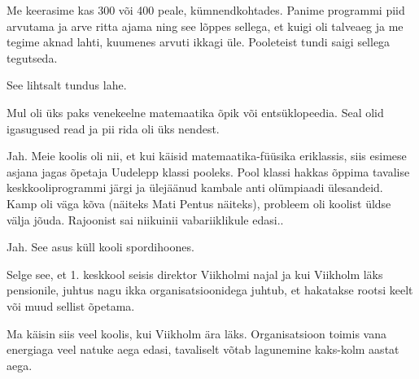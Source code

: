 Me keerasime kas 300 või 400 peale, kümnendkohtades. Panime programmi piid arvutama ja arve ritta ajama ning see lõppes sellega, et 
kuigi oli talveaeg ja me tegime aknad lahti, kuumenes arvuti ikkagi üle. 
Pooleteist tundi saigi sellega tegutseda.


See lihtsalt tundus lahe.


Mul oli üks paks venekeelne matemaatika õpik või 
entsüklopeedia. Seal olid igasugused read ja pii rida oli 
üks nendest.


Jah. Meie koolis oli nii, et kui käisid 
matemaatika-füüsika eriklassis, siis esimese asjana jagas õpetaja 
Uudelepp klassi pooleks. Pool klassi hakkas õppima tavalise 
keskkooliprogrammi järgi ja ülejäänud kambale anti olümpiaadi ülesandeid. 
Kamp oli väga kõva (näiteks Mati 
Pentus näiteks), probleem oli koolist üldse välja jõuda. Rajoonist sai 
niikuinii vabariiklikule edasi.. 


Jah. See asus küll kooli spordihoones. 

Selge see, et 1. keskkool seisis direktor Viikholmi najal ja kui 
Viikholm läks pensionile, juhtus nagu ikka organisatsioonidega juhtub, et 
hakatakse rootsi keelt või muud sellist õpetama.


Ma käisin siis veel koolis, kui Viikholm ära läks. Organisatsioon toimis vana energiaga 
veel natuke aega edasi, tavaliselt võtab lagunemine 
kaks-kolm aastat aega.


